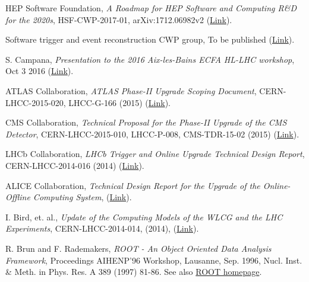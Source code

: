 \documentclass[11pt,letterpaper,fleqn]{article}
\begin{document}
\linenumbers
\thispagestyle{empty}


\newpage
\tableofcontents
\newpage
\setcounter{page}{1}



%
%


\begin{thebibliography}{9}

HEP Software Foundation,
\textit{A Roadmap for HEP Software and Computing R\&D for the 2020s},
HSF-CWP-2017-01, arXiv:1712.06982v2 (\href{https://arxiv.org/abs/1712.06982}{Link}).

Software trigger and event reconstruction CWP group, To be published (\href{https://docs.google.com/document/d/1QRO8RA488fwfSg5CSjmvm16-pZpGApSA0l666g_mS_0}{Link}).

S. Campana,
\textit{Presentation to the 2016 Aix-les-Bains ECFA HL-LHC workshop},
Oct 3 2016 (\href{https://indico.cern.ch/event/524795/contributions/2236590/attachments/1347419/2032314/ECFA2016.pdf}{Link}).

 ATLAS Collaboration, \textit{ATLAS Phase-II Upgrade Scoping Document},
CERN-LHCC-2015-020, LHCC-G-166 (2015) (\href{https://cds.cern.ch/record/2055248}{Link}).

CMS Collaboration,
\textit{Technical Proposal for the Phase-II Upgrade of the CMS Detector}, 
CERN-LHCC-2015-010, LHCC-P-008, CMS-TDR-15-02 (2015) (\href{https://cds.cern.ch/record/2020886}{Link}). 

LHCb Collaboration, 
\textit{LHCb Trigger and Online Upgrade Technical Design Report},
CERN-LHCC-2014-016 (2014) (\href{https://cds.cern.ch/record/1701361}{Link}).

ALICE Collaboration, 
\textit{Technical Design Report for the Upgrade of the Online-Offline Computing System}, 
(\href{https://cds.cern.ch/record/2011297}{Link}).

I. Bird, et. al., 
\textit{Update of the Computing Models of the WLCG and the LHC Experiments},
CERN-LHCC-2014-014, (2014), (\href{http://cds.cern.ch/record/1695401/files/LCG-TDR-002.pdf}{Link}).


R. Brun and F. Rademakers,
\textit{ROOT - An Object Oriented Data Analysis Framework}, 
Proceedings AIHENP'96 Workshop, Lausanne, Sep. 1996, Nucl. Inst. \& Meth. in Phys. Res. A 389 (1997) 81-86. See also \href{http://root.cern.ch}{ROOT homepage}.



\end{thebibliography}
\end{document}
